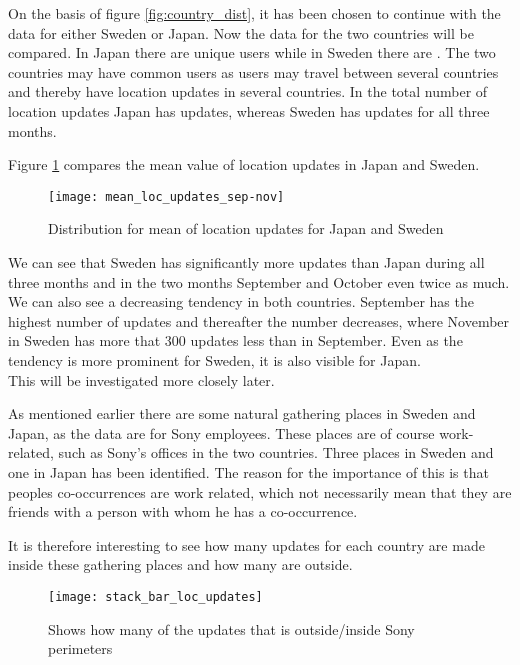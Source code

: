 On the basis of figure \ref{fig:country_dist}, it has been chosen to continue with the data for either Sweden or Japan. Now the data for the two countries will be compared. 
In Japan there are \numberUsersJapan{} unique users while in Sweden there are \numberUsersSweden{}. The two countries may have common users as users may travel between several countries and thereby have location updates in several countries.  
In the total number of location updates Japan has \locUpdatesJapan{} updates, whereas Sweden has \locUpdatesSweden{} updates for all three months. 

Figure \ref{fig:mean_loc_updates_sep-nov} compares the mean value of location updates in Japan and Sweden. 

\begin{figure}[H]
    \hspace*{-2.2cm}
    \centering
    \texttt{[image: mean\_loc\_updates\_sep-nov]}
    \caption{Distribution for mean of location updates for Japan and Sweden}
    \label{fig:mean_loc_updates_sep-nov}
\end{figure}


We can see that Sweden has significantly more updates than Japan during all three months and in the two months September and October even twice as much. We can also see a decreasing tendency in both countries. September has the highest number of updates and thereafter the number decreases, where November in Sweden has more that 300 updates less than in September. Even as the tendency is more prominent for Sweden, it is also visible for Japan.  \\
This will be investigated more closely later.  


As mentioned earlier there are some natural gathering places in Sweden and Japan, as the data are for Sony employees. These places are of course work-related, such as Sony's offices in the two countries. Three places in Sweden and one in Japan has been identified. The reason for the importance of this is that peoples co-occurrences are work related, which not necessarily mean that they are friends with a person with whom he has a co-occurrence. 

It is therefore interesting to see how many updates for each country are made inside these gathering places and how many are outside.  

\begin{figure}[H]
    \hspace*{-2.2cm}
    \centering
    \texttt{[image: stack\_bar\_loc\_updates]}
    \caption{Shows how many of the updates that is outside/inside Sony perimeters}
    \label{fig:hq_stack_bar}
\end{figure}

